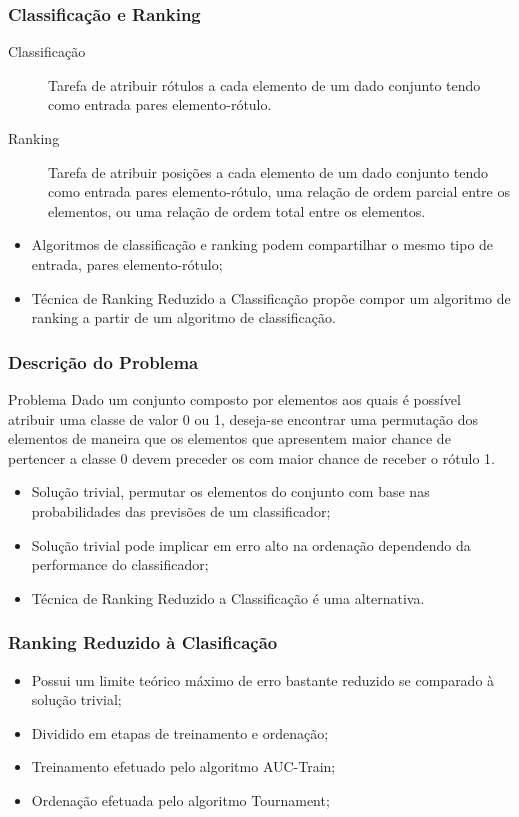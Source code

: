 \begin{frame}
    \frametitle{Classificação e Ranking}

    \begin{description}
        \item[Classificação] Tarefa de atribuir rótulos a cada elemento de um dado conjunto tendo como entrada pares elemento-rótulo.

        \item[Ranking] Tarefa de atribuir posições a cada elemento de um dado conjunto tendo como entrada pares elemento-rótulo, uma relação de ordem parcial entre os elementos, ou uma relação de ordem total entre os elementos.
    \end{description}

    \begin{itemize}
        \item Algoritmos de classificação e ranking podem compartilhar o mesmo tipo de entrada, pares elemento-rótulo;
        \item Técnica de Ranking Reduzido a Classificação propõe compor um algoritmo de ranking a partir de um algoritmo de classificação.
    \end{itemize}
\end{frame}

\begin{frame}
    \frametitle{Descrição do Problema}

    \begin{block}{Problema}
        Dado um conjunto composto por elementos aos quais é possível atribuir uma classe de valor 0 ou 1, deseja-se encontrar uma permutação dos elementos de maneira que os elementos que apresentem maior chance de pertencer a classe 0 devem preceder os com maior chance de receber o rótulo 1.
    \end{block}

    \begin{itemize}
        \item Solução trivial, permutar os elementos do conjunto com base nas probabilidades das previsões de um classificador;
        \item Solução trivial pode implicar em erro alto na ordenação dependendo da performance do classificador;
        \item Técnica de Ranking Reduzido a Classificação é uma alternativa.
    \end{itemize}
\end{frame}

\begin{frame}
    \frametitle{Ranking Reduzido à Clasificação}

    \begin{itemize}
        \item Possui um limite teórico máximo de erro bastante reduzido se comparado à solução trivial;
        \item Dividido em etapas de treinamento e ordenação;
        \item Treinamento efetuado pelo algoritmo AUC-Train;
        \item Ordenação efetuada pelo algoritmo Tournament;
    \end{itemize}
\end{frame}

